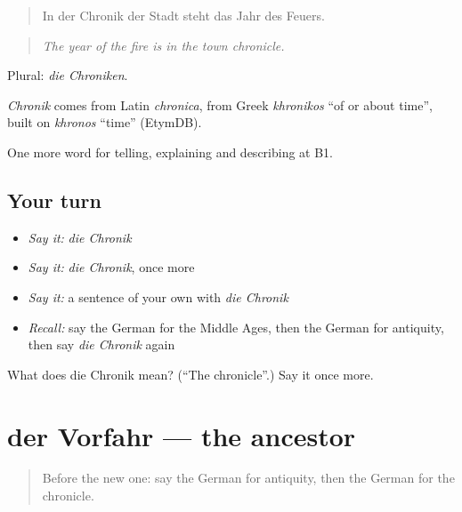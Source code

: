 \begin{quote}
In der Chronik der Stadt steht das Jahr des Feuers.
\end{quote}

\begin{quote}
\emph{The year of the fire is in the town chronicle.}
\end{quote}

Plural: \emph{die Chroniken}.

\begin{cousinweb}
\emph{Chronik} comes from Latin \emph{chronica}, from Greek \emph{khronikos} \textquotedblleft{}of or about time\textquotedblright{}, built on \emph{khronos} \textquotedblleft{}time\textquotedblright{} (EtymDB).
\end{cousinweb}

\begin{grammarlens}[title={What you've built}]
One more word for telling, explaining and describing at B1.
\end{grammarlens}

\subsection*{Your turn}
\begin{itemize}
\raggedright
  \item \emph{Say it:} \emph{die Chronik}
  \item \emph{Say it:} \emph{die Chronik}, once more
  \item \emph{Say it:} a sentence of your own with \emph{die Chronik}
  \item \emph{Recall:} say the German for the Middle Ages, then the German for antiquity, then say \emph{die Chronik} again
\end{itemize}

\begin{tcolorbox}[breakable,colback=teal!4,colframe=teal!35!black,title={Before you move on}]
What does die Chronik mean? (\textquotedblleft{}The chronicle\textquotedblright{}.) Say it once more.
\end{tcolorbox}
\section[der Vorfahr]{der Vorfahr — the ancestor}

\label{lesson:GE-C320-vorfahr}



\begin{quote}
Before the new one: say the German for antiquity, then the German for the chronicle.
\end{quote}

